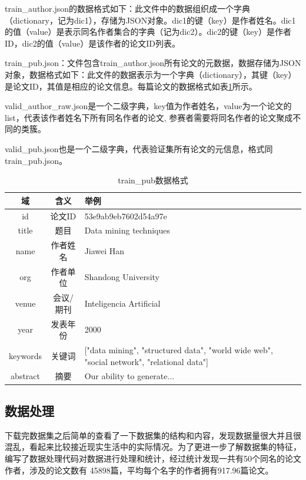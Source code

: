 \documentclass[sigchi]{acmart}
\begin{document}
train\_author.json的数据格式如下：此文件中的数据组织成一个字典（dictionary，记为dic1），存储为JSON对象。dic1的键（key）是作者姓名。dic1的值（value）是表示同名作者集合的字典（记为dic2）。dic2的键（key）是作者ID，dic2的值（value）是该作者的论文ID列表。

train\_pub.json：文件包含train\_author.json所有论文的元数据，数据存储为JSON对象，数据格式如下：此文件的数据表示为一个字典（dictionary），其键（key）是论文ID，其值是相应的论文信息。每篇论文的数据格式如表\ref{tab:train}所示。

valid\_author\_raw.json是一个二级字典，key值为作者姓名，value为一个论文的list，代表该作者姓名下所有同名作者的论文, 参赛者需要将同名作者的论文聚成不同的类簇。 

valid\_pub.json也是一个二级字典，代表验证集所有论文的元信息，格式同train\_pub.json。

\begin{table}[h]
    \caption{train\_pub数据格式}
    \label{tab:train}
    \begin{tabular}{ccp{4cm}}
      \toprule
      域       & 含义    & 举例    \\
    \midrule
    id                  & 论文ID  & 53e9ab9eb7602d54a97e                                                                \\
    title          & 题目    & Data mining techniques                                                          \\
    name   & 作者姓名  & Jiawei Han                                                                                    \\
    org    & 作者单位  & Shandong University             \\
    venue          & 会议/期刊 & Inteligencia Artificial       \\
    year            & 发表年份  & 2000                         \\
    keywords      & 关键词   & {[}"data mining", "structured data", "world wide web", "social network", "relational data"{]} \\
    abstract            & 摘要    & Our ability to generate...   \\
    \bottomrule
  \end{tabular}
  \end{table}



\subsection{数据处理}
下载完数据集之后简单的查看了一下数据集的结构和内容，发现数据量很大并且很混乱，看起来比较接近现实生活中的实际情况。为了更进一步了解数据集的特征，编写了数据处理代码对数据进行处理和统计，经过统计发现一共有50个同名的论文作者，涉及的论文数有 45898篇，平均每个名字的作者拥有917.96篇论文。
\end{document}
